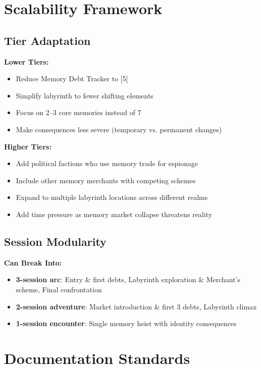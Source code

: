 \documentclass[11pt]{article}
\begin{document}
\section*{Scalability Framework}

\subsection*{Tier Adaptation}
\textbf{Lower Tiers:}
\begin{itemize}[leftmargin=*]
  \item Reduce Memory Debt Tracker to [5]
  \item Simplify labyrinth to fewer shifting elements
  \item Focus on 2--3 core memories instead of 7
  \item Make consequences less severe (temporary vs. permanent changes)
\end{itemize}

\textbf{Higher Tiers:}
\begin{itemize}[leftmargin=*]
  \item Add political factions who use memory trade for espionage
  \item Include other memory merchants with competing schemes
  \item Expand to multiple labyrinth locations across different realms
  \item Add time pressure as memory market collapse threatens reality
\end{itemize}

\subsection*{Session Modularity}
\textbf{Can Break Into:}
\begin{itemize}[leftmargin=*]
  \item \textbf{3-session arc}: Entry \& first debts, Labyrinth exploration \& Merchant's scheme, Final confrontation
  \item \textbf{2-session adventure}: Market introduction \& first 3 debts, Labyrinth climax
  \item \textbf{1-session encounter}: Single memory heist with identity consequences
\end{itemize}

\section*{Documentation Standards}
\end{document}
